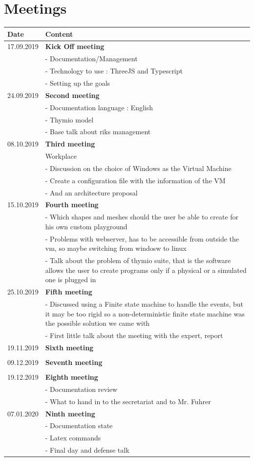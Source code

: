 \documentclass{scrbook}
\begin{document}
\chapter{Meetings}
\begin{tabular}{ | m{3cm} | m{10cm} | }
  \hline
  Date & Content \\
  \hline
  17.09.2019 & \textbf{Kick Off meeting}\\
  & - Documentation/Management\\
  & - Technology to use : ThreeJS and Typescript\\
  & - Setting up the goals\\
  \hline
  24.09.2019 & \textbf{Second meeting} \\
  & - Documentation language : English \\
  & - Thymio model \\
  & - Base talk about riks management \\
  \hline
  08.10.2019 & \textbf{Third meeting}\\
  & Workplace\\
  & - Discussion on the choice of Windows as the Virtual Machine \\
  & - Create a configuration file with the information of the VM \\
  & - And an architecture proposal \\
  \hline
  15.10.2019 & \textbf{Fourth meeting} \\
  & - Which shapes and meshes should the user be able to create for his own custom playground \\
  & - Problems with webserver, has to be accessible from outside the vm, so maybe switching from windosw to linux \\
  & - Talk about the problem of thymio suite, that is the software allows the user to create programs only if a physical or a simulated one is plugged in \\
  \hline
  25.10.2019 & \textbf{Fifth meeting} \\
  & - Discussed using a Finite state machine to handle the events, but it may be too rigid so a non-deterministic finite state machine was the possible solution we came with \\
  & - First little talk about the meeting with the expert, report\\
  \hline
  19.11.2019 & \textbf{Sixth meeting} \\
  & \\
  \hline
  09.12.2019 & \textbf{Seventh meeting} \\
  & \\
  \hline
  19.12.2019 & \textbf{Eighth meeting} \\
  & - Documentation review\\
  & - What to hand in to the secretariat and to Mr. Fuhrer\\
  \hline
  07.01.2020 & \textbf{Ninth meeting} \\
  & - Documentation state\\
  & - Latex commands\\
  & - Final day and defense talk\\
  \hline
\end{tabular}
\end{document}
